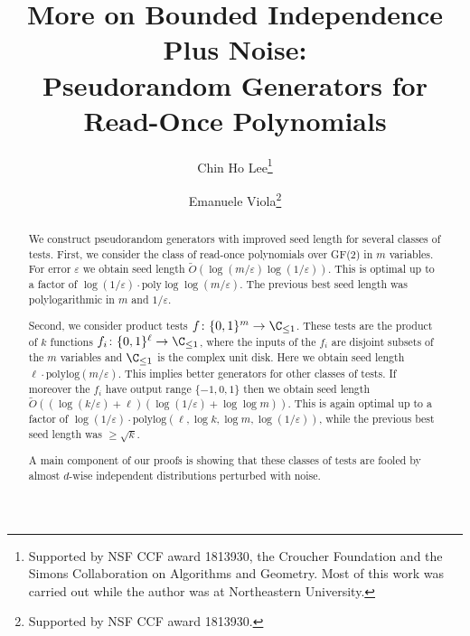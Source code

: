 \documentclass{toc}
\newcommand{\zo}{\{0,1\}}
\def\eps{\varepsilon}
\def\Blocklength{\ell}
\def\poly{\mathrm{poly}}
\def\polylog{\mathrm{polylog}}
\begin{document}
\begin{frontmatter}[classification=text]
  
%
\title{More on Bounded Independence Plus Noise:\\ Pseudorandom Generators for\\ Read-Once Polynomials}  %

%
%

%
%
%

%
%
%
%
%
%
%
%
%
%
%
%


%
%
%
%

%

\author[lee]{Chin Ho Lee\thanks{Supported by NSF CCF award 1813930, 
    the Croucher Foundation and the Simons Collaboration on Algorithms
    and Geometry. Most of this work was carried out
    while the author was at Northeastern University.}}
\author[viola]{Emanuele Viola\thanks{Supported by NSF CCF award 1813930.}}

%
%
%
%

%
%
%
%
%
%
\begin{abstract}
We construct pseudorandom generators with improved seed length for several classes of tests. First, we consider the class of read-once
polynomials over GF(2) in $m$ variables.
For error $\eps$ we obtain seed length $\tilde O (\log(m/\eps) \log(1/\eps) )$.
This is optimal up to a factor of $\log(1/\eps) \cdot \poly\log\log(m/\eps)$.
The previous best seed length was polylogarithmic in $m$ and $1/\eps$.

Second, we consider product tests $f\colon \zo^m \to \C_{\le 1}$.
These tests are the product of $k$ functions $f_i\colon \zo^\Blocklength \to \C_{\le 1}$, where the inputs of the $f_i$ are disjoint subsets of the $m$ variables and $\C_{\le 1}$ is the complex unit disk.
Here we obtain seed length $\Blocklength \cdot \polylog (m/\eps)$.
This implies better generators for other classes of tests.
If moreover the $f_i$ have output range $\{-1, 0, 1\}$ then we obtain seed length $\tilde O((\log(k/\eps) + \Blocklength) (\log(1/\eps) + \log\log m))$.
This is again optimal up to a factor of $\log(1/\eps) \cdot \polylog(\ell, \log k, \log m, \log(1/\eps))$, while the previous best seed length was $\ge \sqrt k$.

A main component of our proofs is showing that these classes of tests are fooled by almost $d$-wise independent distributions perturbed with noise.
\end{abstract}

%

\end{frontmatter}
\end{document}

